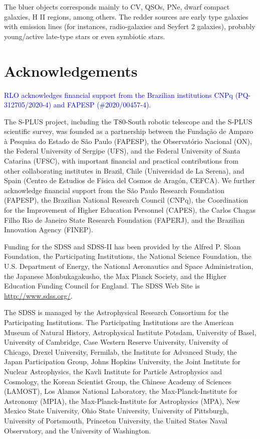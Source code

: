 \documentclass[fleqn,usenatbib]{mnras}
\newcommand{\rlopes}[1]{\textcolor{blue}{#1}}
\begin{document}
The bluer objects corresponds mainly to  CV, QSOs, PNe, dwarf compact galaxies, H II regions, 
among others. The redder sources are early type galaxies with emission lines (for instances, 
radio-galaxies and Seyfert 2 galaxies), probably young/active late-type stars or 
even symbiotic stars. 

\section*{Acknowledgements}

\rlopes{RLO acknowledges financial support from the Brazilian institutions CNPq (PQ-312705/2020-4) and FAPESP (\#2020/00457-4).}

The S-PLUS project, including the T80-South robotic telescope and
the S-PLUS scientific survey, was founded as a partnership between the
Fundação de Amparo à Pesquisa do Estado de S\~{a}o Paulo
(FAPESP), the Observatório Nacional (ON), the Federal University of
Sergipe (UFS), and the Federal University of Santa Catarina
(UFSC), with important financial and practical contributions from
other collaborating institutes in Brazil, Chile (Universidad de La
Serena), and Spain (Centro de Estudios de Física del Cosmos de
Aragón, CEFCA). We further acknowledge financial support from
the São Paulo Research Foundation (FAPESP), the Brazilian National
Research Council (CNPq), the Coordination for the Improvement of
Higher Education Personnel (CAPES), the Carlos Chagas Filho Rio
de Janeiro State Research Foundation (FAPERJ), and the Brazilian
Innovation Agency (FINEP).

Funding for the SDSS and SDSS-II has been provided by the Alfred P.
Sloan Foundation, the Participating Institutions, the National Science
Foundation, the U.S. Department of Energy, the National Aeronautics
and Space Administration, the Japanese Monbukagakusho, the Max
Planck Society, and the Higher Education Funding Council for England.
The SDSS Web Site is \url{http://www.sdss.org/}.

The SDSS is managed by the Astrophysical Research Consortium for
the Participating Institutions. The Participating Institutions
are the American Museum of Natural History, Astrophysical Institute Potsdam,
University of Basel, University of Cambridge, Case Western Reserve University,
University of Chicago, Drexel University, Fermilab, the Institute for Advanced
Study, the Japan Participation Group, Johns Hopkins University, the Joint
Institute for Nuclear Astrophysics, the Kavli Institute for Particle Astrophysics
and Cosmology, the Korean Scientist Group, the Chinese Academy of Sciences (LAMOST),
Los Alamos National Laboratory, the Max-Planck-Institute for Astronomy (MPIA),
the Max-Planck-Institute for Astrophysics (MPA), New Mexico State University,
Ohio State University, University of Pittsburgh, University of Portsmouth,
Princeton University, the United States Naval Observatory, and the University
of Washington.
\end{document}
